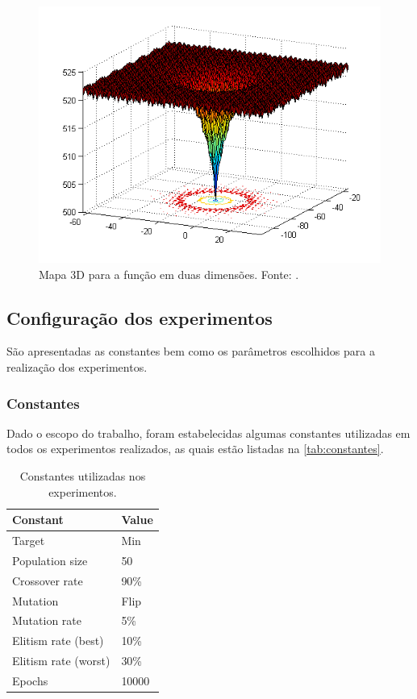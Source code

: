 \begin{figure}[!ht]%
    \centering
    \includegraphics[scale=0.5]{img/f5.png}
    \caption{Mapa 3D para a função  em duas dimensões. Fonte: .}%
    \label{fig:f5}
\end{figure}

\subsection{Configuração dos experimentos}

São apresentadas as constantes bem como os parâmetros escolhidos para a realização dos experimentos.

\subsubsection{Constantes}

Dado o escopo do trabalho, foram estabelecidas algumas constantes utilizadas em todos os experimentos realizados, as quais estão listadas na \autoref{tab:constantes}.

\begin{table}[htb]
    \center%
    \begin{tabular}{l l}
        \bottomrule
        \textbf{Constant}    & \textbf{Value} \\ \midrule
        Target               & Min            \\ \midrule
        Population size      & 50             \\ \midrule
        Crossover rate       & 90\%           \\ \midrule
        Mutation             & Flip           \\ \midrule
        Mutation rate        & 5\%            \\ \midrule
        Elitism rate (best)  & 10\%           \\ \midrule
        Elitism rate (worst) & 30\%           \\ \midrule
        Epochs               & 10000          \\ \toprule
    \end{tabular}
    \caption{Constantes utilizadas nos experimentos.}%
    \label{tab:constantes}
\end{table}


